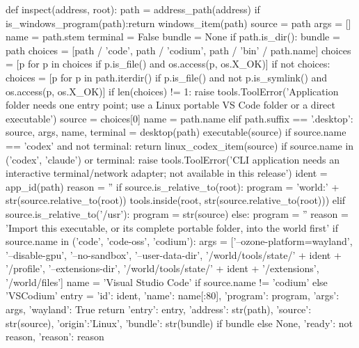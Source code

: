 def inspect(address, root):
    path = address_path(address)
    if is_windows_program(path):return windows_item(path)
    source = path
    args = []
    name = path.stem
    terminal = False
    bundle = None
    if path.is_dir():
        bundle = path
        choices = [path / 'code', path / 'codium', path / 'bin' / path.name]
        choices = [p for p in choices if p.is_file() and os.access(p, os.X_OK)]
        if not choices:
            choices = [p for p in path.iterdir() if p.is_file() and not p.is_symlink() and os.access(p, os.X_OK)]
        if len(choices) != 1:
            raise tools.ToolError('Application folder needs one entry point; use a Linux portable VS Code folder or a direct executable')
        source = choices[0]
        name = path.name
    elif path.suffix == '.desktop':
        source, args, name, terminal = desktop(path)
    executable(source)
    if source.name == 'codex' and not terminal:
        return linux_codex_item(source)
    if source.name in ('codex', 'claude') or terminal:
        raise tools.ToolError('CLI application needs an interactive terminal/network adapter; not available in this release')
    ident = app_id(path)
    reason = ''
    if source.is_relative_to(root):
        program = 'world:' + str(source.relative_to(root))
        tools.inside(root, str(source.relative_to(root)))
    elif source.is_relative_to('/usr'):
        program = str(source)
    else:
        program = ''
        reason = 'Import this executable, or its complete portable folder, into the world first'
    if source.name in ('code', 'code-oss', 'codium'):
        args = ['--ozone-platform=wayland', '--disable-gpu', '--no-sandbox',
                '--user-data-dir', '/world/tools/state/' + ident + '/profile',
                '--extensions-dir', '/world/tools/state/' + ident + '/extensions', '/world/files']
        name = 'Visual Studio Code' if source.name != 'codium' else 'VSCodium'
    entry = {'id': ident, 'name': name[:80], 'program': program, 'args': args, 'wayland': True}
    return {'entry': entry, 'address': str(path), 'source': str(source), 'origin':'Linux',
            'bundle': str(bundle) if bundle else None, 'ready': not reason, 'reason': reason}


